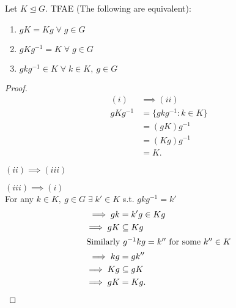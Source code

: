 \begin{proposition}
\protect\hypertarget{prp:four}{}\label{prp:four}

Let $K \trianglelefteq G$.
TFAE (The following are equivalent):

\begin{enumerate}
\def\labelenumi{\roman{enumi}.}
\item
  $gK = Kg \; \forall \; g \in G$
\item
  $gKg^{-1} = K \; \forall \; g \in G$
\item
  $gkg^{-1} \in K \; \forall \; k \in K,\ g \in G$
\end{enumerate}

\end{proposition}

\begin{proof}
\begin{align*}
    (i) &\implies (ii) \\
    gKg^{-1} &= \{gkg^{-1} : k \in K \} \\
    &= (gK) g^{-1} \\
    &= (Kg)g^{-1} \\
    &= K.
\end{align*}

$(ii) \implies (iii)$

$(iii) \implies (i)$ \\
For any $k \in K,\ g \in G \; \exists \; k' \in K$ s.t. $gkg^{-1} = k'$
  \begin{align*}
    \implies gk &= k'g \in Kg \\
    \implies gK &\subseteq Kg \\
    \intertext{Similarly $g^{-1}kg = k''$ for some $k'' \in K$}
    \implies kg &= gk'' \\
    \implies Kg &\subseteq gK \\
    \implies gK &= Kg.
  \end{align*}
\end{proof}

